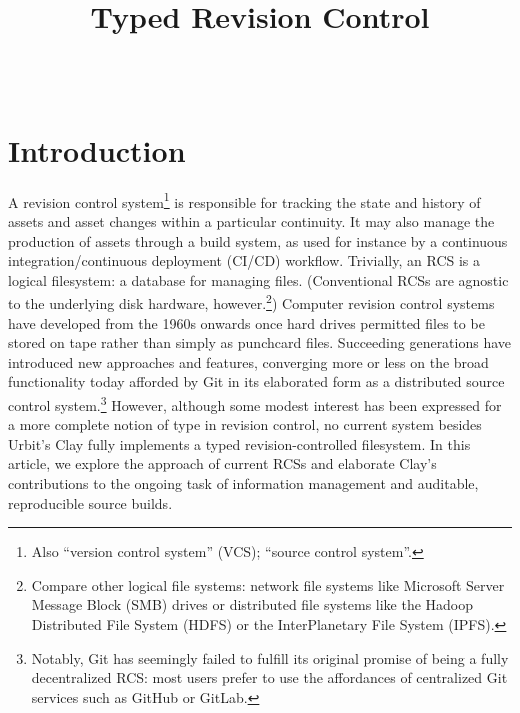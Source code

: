 \documentclass[twoside]{article}
\title{Typed Revision Control}
\author{\authorname~\authorpatp \\ \affiliation}
\date{}
\begin{document}
\maketitle
\thispagestyle{firststyle}

\begin{abstract}
  
\end{abstract}

\setcounter{page}{1}

\tableofcontents

\section{Introduction}

A revision control system\footnote{Also “version control system” (VCS); “source control system”.} is responsible for tracking the state and history of assets and asset changes within a particular continuity.  It may also manage the production of assets through a build system, as used for instance by a continuous integration/continuous deployment (CI/CD) workflow.  Trivially, an RCS is a logical filesystem:  a database for managing files.  (Conventional RCSs are agnostic to the underlying disk hardware, however.\footnote{Compare other logical file systems:  network file systems like Microsoft Server Message Block (SMB) drives or distributed file systems like the Hadoop Distributed File System (HDFS) or the InterPlanetary File System (IPFS).})  Computer revision control systems have developed from the 1960s onwards once hard drives permitted files to be stored on tape rather than simply as punchcard files.  Succeeding generations have introduced new approaches and features, converging more or less on the broad functionality today afforded by Git \citep{Torvalds2005} in its elaborated form as a distributed source control system.\footnote{Notably, Git has seemingly failed to fulfill its original promise of being a fully decentralized RCS:  most users prefer to use the affordances of centralized Git services such as GitHub or GitLab.}  However, although some modest interest has been expressed for a more complete notion of type in revision control, no current system besides Urbit's Clay fully implements a typed revision-controlled filesystem.  In this article, we explore the approach of current RCSs and elaborate Clay's contributions to the ongoing task of information management and auditable, reproducible source builds.
\end{document}

